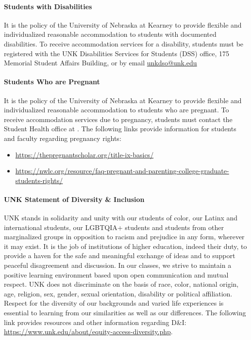 \documentclass[12pt]{article}
\newcounter{ex}\setcounter{ex}{0}
\begin{document}
\paragraph{Students with Disabilities} It is the policy of the University of Nebraska 
at Kearney to provide flexible and individualized reasonable accommodation 
to students with documented disabilities. To receive accommodation services 
for a disability, students must be registered with the UNK Disabilities Services 
for Students (DSS) office, 175 Memorial Student Affairs Building, 
 or by email 
\href{mailto:unkdso@unk.edu}{unkdso@unk.edu}  


\paragraph{Students Who are Pregnant} It is the policy of the University of Nebraska at Kearney to provide flexible and 
individualized reasonable accommodation to students who are pregnant. To receive 
accommodation services due to pregnancy, students must contact the 
Student Health office at . The following links provide information 
for students and faculty regarding pregnancy rights: 

\begin{itemize}
\item \url{https://thepregnantscholar.org/title-ix-basics/} 

\item \url{https://nwlc.org/resource/faq-pregnant-and-parenting-college-graduate-students-rights/}

\end{itemize}

\paragraph{UNK Statement of Diversity \& Inclusion}

UNK stands in solidarity and unity with our students of color, our Latinx 
and international students, our LGBTQIA+ students and students from other 
marginalized groups in opposition to racism and prejudice in any form, 
wherever it may exist. It is the job of institutions of higher education, 
indeed their duty, to provide a haven for the safe and meaningful exchange of 
ideas and to support peaceful disagreement and discussion. In our classes, 
we strive to maintain a positive learning environment based upon open 
communication and mutual respect. UNK does not discriminate on the basis of 
race, color, national origin, age, religion, sex, gender, sexual orientation, 
disability or political affiliation. Respect for the diversity of our backgrounds 
and varied life experiences is essential to learning from our similarities as 
well as our differences. The following link provides resources and other 
information regarding D\&I: \url{https://www.unk.edu/about/equity-access-diversity.php}.


  
 
\end{document}
